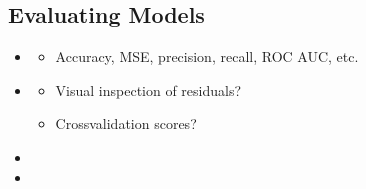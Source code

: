 \documentclass[letterpaper,10pt,english]{jupyterBook}
\begin{document}
\subsection{Evaluating Models}
\label{\detokenize{conclusion:evaluating-models}}\begin{itemize}
\item {} 
\sphinxAtStartPar
{}
\begin{itemize}
\item {} 
\sphinxAtStartPar
Accuracy, MSE, precision, recall, ROC AUC, etc.

\end{itemize}

\item {} 
\sphinxAtStartPar
{}
\begin{itemize}
\item {} 
\sphinxAtStartPar
Visual inspection of residuals?

\item {} 
\sphinxAtStartPar
Cross\sphinxhyphen{}validation scores?

\end{itemize}

\item {} 
\sphinxAtStartPar
{}

\item {} 
\sphinxAtStartPar
{}

\end{itemize}
\end{document}
